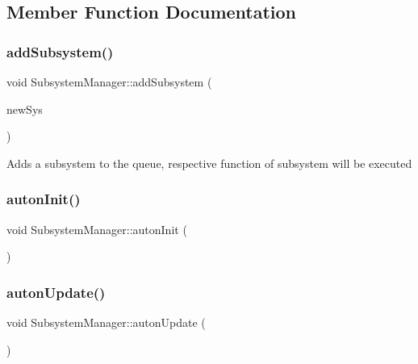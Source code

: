 \subsection{Member Function Documentation}
\mbox{\label{classSubsystemManager_ae3910a93d2d417e07013d4b396d3a78b}} 
\subsubsection{\texorpdfstring{add\+Subsystem()}{addSubsystem()}}
{\footnotesize\ttfamily void Subsystem\+Manager\+::add\+Subsystem (\begin{DoxyParamCaption}\item[{const std\+::shared\+\_\+ptr$<$ \hyperlink{classFluxSubsystem}{Flux\+Subsystem} $>$ \&}]{new\+Sys }\end{DoxyParamCaption})}

Adds a subsystem to the queue, respective function of subsystem will be executed \mbox{\label{classSubsystemManager_a41232e2fb8956d8321522a23a1f63491}} 
\subsubsection{\texorpdfstring{auton\+Init()}{autonInit()}}
{\footnotesize\ttfamily void Subsystem\+Manager\+::auton\+Init (\begin{DoxyParamCaption}{ }\end{DoxyParamCaption})}

\mbox{\label{classSubsystemManager_aa5bfa5743a4b8fdb8a6d83208b2f95dd}} 
\subsubsection{\texorpdfstring{auton\+Update()}{autonUpdate()}}
{\footnotesize\ttfamily void Subsystem\+Manager\+::auton\+Update (\begin{DoxyParamCaption}{ }\end{DoxyParamCaption})}


